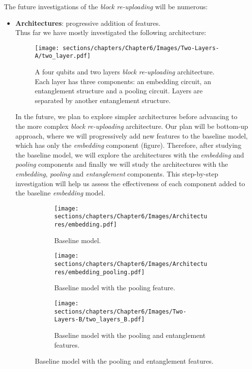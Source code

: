 
The future investigations of the \textit{block re-uploading} will be numerous:

\begin{itemize}
    \item \textbf{Architectures}: progressive addition of features.\\
    Thus far we have mostly investigated the following architecture:

    \begin{figure}[h]
        \centering
        \texttt{[image: sections/chapters/Chapter6/Images/Two-Layers-A/two\_layer.pdf]}
        \caption{A four qubits and two layers \textit{block re-uploading} architecture. Each layer has three 
        components: an embedding circuit, an entanglement structure and a pooling circuit.
        Layers are separated by another entanglement structure.}
    \end{figure}

    In the future, we plan to explore simpler architectures before advancing to the more 
    complex \textit{block re-uploading} architecture. 
    Our plan will be bottom-up approach, where we will progressively add new features to the baseline model, 
    which has only the \textit{embedding} component (figure).
    Therefore, after studying the baseline model, we will explore the architectures with the 
    \textit{embedding} and \textit{pooling} components and finally we will study the architectures 
    with the \textit{embedding}, \textit{pooling} and \textit{entanglement} components.
    This step-by-step investigation will 
    help us assess the effectiveness of each component added to the baseline \textit{embedding} model.

    \begin{figure}[h]
        \centering
        \begin{subfigure}[b]{\textwidth}
            \texttt{[image: sections/chapters/Chapter6/Images/Architectures/embedding.pdf]}
        \caption{Baseline model.}
        \end{subfigure}
        \begin{subfigure}[b]{\textwidth}
            \texttt{[image: sections/chapters/Chapter6/Images/Architectures/embedding\_pooling.pdf]}
        \caption{Baseline model with the pooling feature.}
        \end{subfigure}
        \begin{subfigure}[b]{\textwidth}
            \texttt{[image: sections/chapters/Chapter6/Images/Two-Layers-B/two\_layers\_B.pdf]}
        \caption{Baseline model with the pooling and entanglement features.}
        \end{subfigure}
    \end{figure}

\end{itemize}
